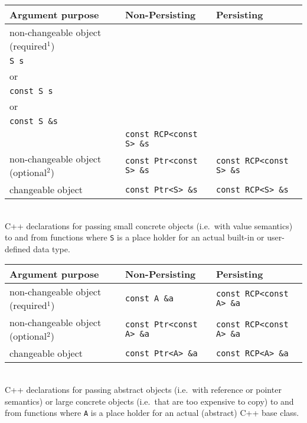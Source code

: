 \documentclass[pdf,ps2pdf,11pt]{SANDreport}
\begin{document}
%
\begin{center}
\begin{minipage}{{}\textwidth}
\begin{tabular}{|l|l|l|}
\hline
Argument purpose
& Non-Persisting
& Persisting \\
\hline
\hline
non-changeable object (required$^1$)
& \begin{minipage}{12ex}
    {\tiny .}\\
    {}\texttt{S s} \\
    or \\
    {}\texttt{const S s} \\
    or \\
    {}\texttt{const S \&s} \\
  \end{minipage}
& {}\texttt{const RCP<const S> \&s} \\
\hline
non-changeable object (optional$^2$)
& {}\texttt{const Ptr<const S> \&s}
& {}\texttt{const RCP<const S> \&s} \\
\hline
changeable object
& {}\texttt{const Ptr<S> \&s}
& {}\texttt{const RCP<S> \&s} \\
\hline
\end{tabular}\\[2ex]
C++ declarations for passing small concrete objects (i.e.~with value
semantics) to and from functions where {}\texttt{S} is a place holder
for an actual built-in or user-defined data type.
\end{minipage}
\end{center}
%
%
\begin{center}
\begin{minipage}{{}\textwidth}
\begin{tabular}{|l|l|l|}
\hline
Argument purpose
& Non-Persisting
& Persisting \\
\hline
\hline
non-changeable object (required$^1$)
& {}\texttt{const A \&a}
& {}\texttt{const RCP<const A> \&a} \\
\hline
non-changeable object (optional$^2$)
& {}\texttt{const Ptr<const A> \&a}
& {}\texttt{const RCP<const A> \&a} \\
\hline
changeable object
& {}\texttt{const Ptr<A> \&a}
& {}\texttt{const RCP<A> \&a} \\
\hline
\end{tabular}\\[2ex]
C++ declarations for passing abstract objects (i.e.\ with reference or
pointer semantics) or large concrete objects (i.e.\ that are too
expensive to copy) to and from functions where {}\texttt{A} is a place
holder for an actual (abstract) C++ base class.
\end{minipage}
\end{center}
\end{document}
